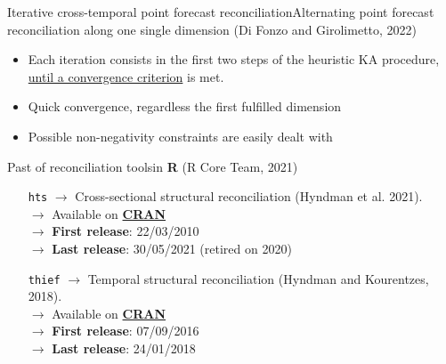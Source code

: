 \documentclass[aspectratio=169, table,colorlinks]{beamer}
\begin{document}
\begin{frame}[label = {cap:ite}]{Iterative cross-temporal point forecast reconciliation}{Alternating point forecast reconciliation along one single dimension (Di Fonzo and Girolimetto, 2022)}
\begin{center}
\end{center}
	\begin{itemize}[itemsep=0.15cm]
	\item {\color{newblue}Each iteration} consists in the {\color{newblue}first two steps} of the heuristic KA procedure, \hyperlink{app:itconv}{\color{newblue}until a convergence criterion} is met. 
	\item {\color{newblue}Quick convergence}, regardless the first fulfilled dimension
	\item Possible {\color{newred}non-negativity constraints} are easily dealt with
	\end{itemize}
\end{frame}

\begin{frame}{Past of reconciliation tools}{in \textbf{\textsf{R}} (R Core Team, 2021)}
\begin{itemize}[topsep = 0mm, itemsep = 2mm, leftmargin = 1.75cm]
	\item[\texttt{hts}] $\rightarrow$ Cross-sectional structural reconciliation (Hyndman et al. 2021). \\
	$\rightarrow$ Available on \href{https://CRAN.R-project.org/package=hts}{\textbf{\textsf{CRAN}}}\\
	$\rightarrow$ \textbf{First release}: 22/03/2010\\
	$\rightarrow$ \textbf{Last release}: 30/05/2021 ({\color{newred}retired on 2020})
	\item[\texttt{thief}] $\rightarrow$ Temporal structural reconciliation (Hyndman and Kourentzes, 2018). \\
	$\rightarrow$ Available on \href{https://CRAN.R-project.org/package=thief}{\textbf{\textsf{CRAN}}}\\
	$\rightarrow$ \textbf{First release}: 07/09/2016\\
	$\rightarrow$ \textbf{Last release}: 24/01/2018
\end{itemize}\vskip0.5cm
\begin{center}
\end{center}
\end{frame}
\end{document}

